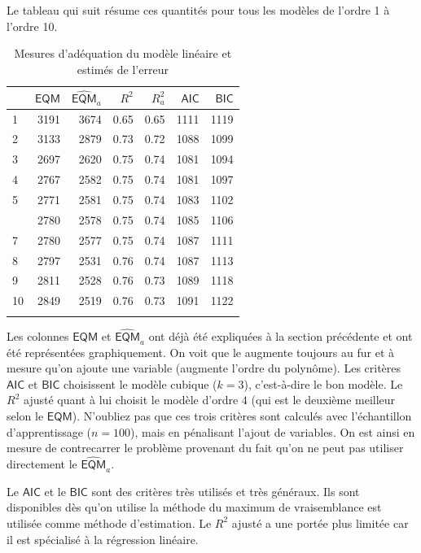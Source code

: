 \documentclass[
  11pt,
  letterpaper,
]{book}
\theoremstyle{definition}
\theoremstyle{definition}
\theoremstyle{definition}
\theoremstyle{remark}
\begin{document}
Le tableau qui suit résume ces quantités pour tous les modèles de l'ordre 1 à l'ordre 10.

\begin{table}

\caption{\label{tab:02-table1}Mesures d'adéquation du modèle linéaire et estimés de l'erreur}
\centering
\begin{tabular}[t]{lrrrrrr}
\toprule{}
  & \(\mathsf{EQM}\) & \(\widehat{\mathsf{EQM}}_a\) & \(R^2\) & \(R^2_a\) & \(\mathsf{AIC}\) & \(\mathsf{BIC}\)\\
\midrule{}
1 & 3191 & 3674 & 0.65 & 0.65 & 1111 & 1119\\
2 & 3133 & 2879 & 0.73 & 0.72 & 1088 & 1099\\
3 & 2697 & 2620 & 0.75 & 0.74 & 1081 & 1094\\
4 & 2767 & 2582 & 0.75 & 0.74 & 1081 & 1097\\
5 & 2771 & 2581 & 0.75 & 0.74 & 1083 & 1102\\
\addlinespace
6 & 2780 & 2578 & 0.75 & 0.74 & 1085 & 1106\\
7 & 2780 & 2577 & 0.75 & 0.74 & 1087 & 1111\\
8 & 2797 & 2531 & 0.76 & 0.74 & 1087 & 1113\\
9 & 2811 & 2528 & 0.76 & 0.73 & 1089 & 1118\\
10 & 2849 & 2519 & 0.76 & 0.73 & 1091 & 1122\\
\bottomrule{}
\end{tabular}
\end{table}

Les colonnes \(\mathsf{EQM}\) et \(\widehat{\mathsf{EQM}}_a\) ont déjà été expliquées à la section précédente et ont été représentées graphiquement.
On voit que le augmente toujours au fur et à mesure qu'on ajoute une variable (augmente l'ordre du polynôme). Les critères \(\mathsf{AIC}\) et \(\mathsf{BIC}\) choisissent le modèle cubique (\(k=3\)), c'est-à-dire le bon modèle. Le \(R^2\) ajusté quant à lui choisit le modèle d'ordre \(4\) (qui est le deuxième meilleur selon le \(\mathsf{EQM}\)). N'oubliez pas que ces trois critères sont calculés avec l'échantillon d'apprentissage (\(n=100\)), mais en pénalisant l'ajout de variables. On est ainsi en mesure de contrecarrer le problème provenant du fait qu'on ne peut pas utiliser directement le \(\widehat{\mathsf{EQM}}_a\).

Le \(\mathsf{AIC}\) et le \(\mathsf{BIC}\) sont des critères très utilisés et très généraux. Ils sont disponibles dès qu'on utilise la méthode du maximum de vraisemblance est utilisée comme méthode d'estimation. Le \(R^2\) ajusté a une portée plus limitée car il est spécialisé à la régression linéaire.
\end{document}
